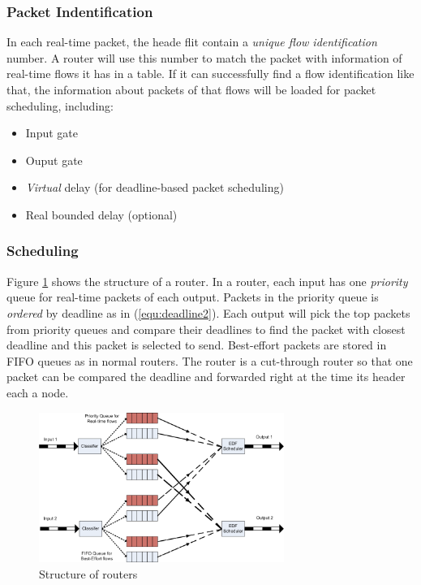 \documentclass[conference, twocolumn]{IEEEtran}
\theoremstyle{definition}
\begin{document}
\subsubsection{Packet Indentification}
In each real-time packet, the heade flit contain a {\em unique flow
identification} number. A router will use this number to match the packet with
information of real-time flows it has in a table. If it can successfully find a
flow identification like that, the information about packets of that flows will
be loaded  for packet scheduling, including:
\begin{itemize}
  \item Input gate
  \item Ouput gate
  \item {\em Virtual} delay (for deadline-based packet scheduling)
  \item Real bounded delay (optional)
\end{itemize}

\subsubsection{Scheduling}
Figure \ref{fig:RouterStructure} shows the structure of a router. In a router,
each input has one {\em priority} queue for real-time packets of each output.
Packets in the priority queue is {\em ordered} by deadline as in
(\ref{equ:deadline2}). Each output will pick the top packets from priority
queues and compare their deadlines to find the packet with closest deadline and this
packet is selected to send. Best-effort packets are stored in FIFO queues as in
normal routers. The router is a cut-through router so that one packet can be
compared the deadline and forwarded right at the time its header each a node.

\begin{figure}[htp]
\centering
\includegraphics[width=8cm]{pics/Router.png}
\caption[Other Spec.]
{Structure of routers}\label{fig:RouterStructure}
\end{figure}
\end{document}
